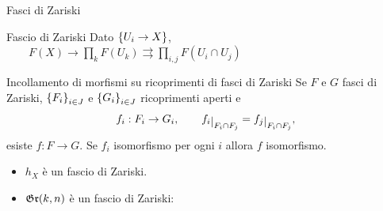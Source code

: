 \documentclass[a4paper]{beamer}
\begin{document}
\begin{frame}{Fasci di Zariski}
\begin{block}{Fascio di Zariski}
Dato $\left\{{U_i\to X}\right\}$, $\qquad F(X)\to \displaystyle \prod_k F(U_k) \rightrightarrows \displaystyle \prod_{i,j}F(U_i\cap U_j)$
\end{block}
\pause
\begin{alertblock}{Incollamento di morfismi su ricoprimenti di fasci di Zariski}
Se $F$ e $G$ fasci di Zariski, $\left\{{F_i}\right\}_{i\in J}$ e $\left\{{G_i}\right\}_{i\in J}$ ricoprimenti aperti e 
\[f_i:F_i\to G_i,\qquad f_i\res{F_i\cap F_j}=f_j\res{F_i\cap F_j},\]
esiste $f:F\to G$. 
Se $f_i$ isomorfismo per ogni $i$ allora $f$ isomorfismo.
\end{alertblock}
\pause
\begin{itemize}
\item $h_X$ \`e un fascio di Zariski.\pause
\item $\mathfrak{Gr}(k,n)$ \`e un fascio di Zariski: 
\end{itemize}
\end{frame}

\end{document}
